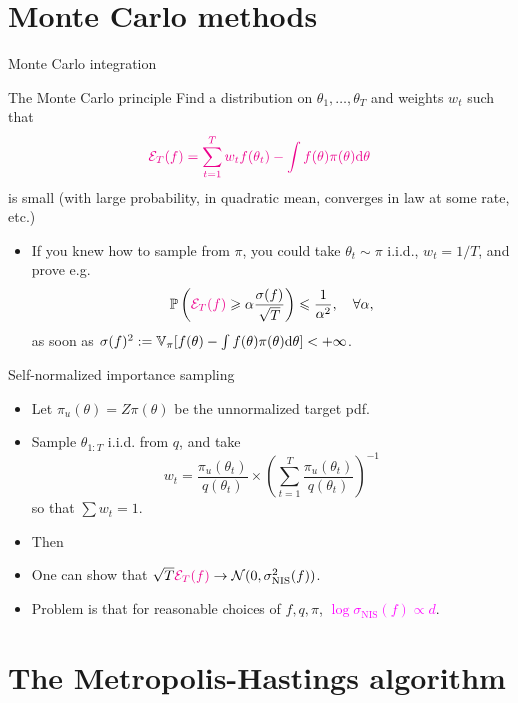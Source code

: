 \documentclass[10pt]{beamer}
\renewcommand\un[1]{\textcolor{magenta}{#1}}
\begin{document}
\section{Monte Carlo methods}
\begin{frame}{Monte Carlo integration}
\begin{block}{The Monte Carlo principle}
Find a distribution on $\theta_1,\dots,\theta_T$ and weights $w_t$ such that
$$ \un{\mathcal{E}_T(f) =  \sum_{t=1}^T w_t f(\theta_t) - \int f(\theta)\pi(\theta)\d \theta}$$
is small (with large probability, in quadratic mean, converges in law at some rate, etc.)
\end{block}
\begin{itemize}
  \item If you knew how to sample from $\pi$, you could take $\theta_t\sim\pi$ i.i.d., $w_t=1/T$, and prove e.g.
  $$ \mathbb{P}\left( \un{\mathcal{E}_T(f)} \geq \alpha\frac{\sigma(f)}{\sqrt{T}} \right) \leq \frac{1}{\alpha^2}, \quad \forall \alpha,$$
  as soon as $\sigma(f)^2 := \mathbb{V}_\pi [f(\theta) - \int f(\theta)\pi(\theta){\rm d}\theta]<+\infty$.
\end{itemize}
\end{frame}

\begin{frame}{Self-normalized importance sampling}
\begin{itemize}
  \item Let $\pi_u(\theta) = Z\pi(\theta)$ be the unnormalized target pdf.
  \item Sample $\theta_{1:T}$ i.i.d. from $q$, and take
  $$
  w_t = \frac{\pi_u(\theta_t)}{q(\theta_t)} \times \left( \sum_{t=1}^T \frac{\pi_u(\theta_t)}{q(\theta_t)} \right)^{-1}
  $$
  so that $\sum w_t = 1$.
  \item Then
  \vspace{2cm}
  \item One can show that $ \sqrt{T}\un{\mathcal{E}_T(f)} \rightarrow \cN(0, \sigma^2_{\text{NIS}}(f))$.
  \item Problem is that for reasonable choices of $f,q,\pi$, \un{$\log \sigma_{\text{NIS}}(f) \propto d$}.
\end{itemize}
\vfill
\end{frame}

\section{The Metropolis-Hastings algorithm}
\end{document}
